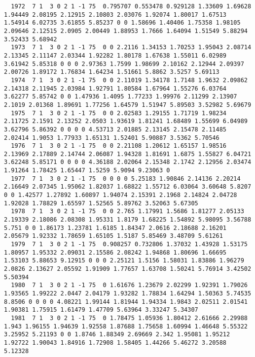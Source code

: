 \begin{landscape}
{\begin{verbatim}
  1972  7 1  3 0 2 1 -1 75  0.795707 0.553478 0.929128 1.33609 1.69628 1.94449 2.08195 2.12915 2.10803 2.03076 1.92074 1.80017 1.67513 1.54914 6.02735 3.61855 5.85237 0 0 1.58696 1.40406 1.75358 1.98105 2.09646 2.12515 2.0905 2.00449 1.88953 1.7666 1.64094 1.51549 5.88294  3.52433 5.68942
  1973  7 1  3 0 2 1 -1 75  0 0 2.2116 1.34153 1.70253 1.95043 2.08714 2.13345 2.11147 2.03344 1.92282 1.80178 1.67638 1.55011 6.02989 3.61942 5.85318 0 0 0 2.97363 1.7599 1.98699 2.10162 2.12944 2.09397 2.00726 1.89172 1.76834 1.64234 1.51661 5.8862 3.5257 5.69113
  1974  7 1  3 0 2 1 -1 75  0 0 2.11019 1.34178 1.7148 1.9632 2.09862 2.14318 2.11945 2.03984 1.92791 1.80584 1.67964 1.55276 6.03764 3.62277 5.85742 0 0 1.47936 1.4095 1.77233 1.99976 2.11299 2.13907 2.1019 2.01368 1.89691 1.77256 1.64579 1.51947 5.89503 3.52982 5.69679
  1975  7 1  3 0 2 1 -1 75  0 0 2.02583 1.29155 1.71719 1.98234 2.11725 2.1591 2.13252 2.0503 1.93619 1.81241 1.68489 1.55699 6.04989 3.62796 5.86392 0 0 0 0 4.53713 2.01885 2.13145 2.15478 2.11485 2.02414 1.9053 1.77933 1.65131 1.52401 5.90887 3.5362 5.70546
  1976  7 1  3 0 2 1 -1 75  0 0 2.21108 1.20612 1.65157 1.98516 2.13969 2.17889 2.14744 2.06087 1.94328 1.81691 1.6875 1.55827 6.04721 3.62248 5.85171 0 0 0 0 4.36188 2.02064 2.15348 2.1742 2.12956 2.03474 1.91264 1.78425 1.65447 1.5259 5.9094 9.23063 0
  1977  7 1  3 0 2 1 -1 75  0 0 0 0 5.25183 1.90846 2.14136 2.20214 2.16649 2.07345 1.95062 1.82037 1.68822 1.55712 6.03064 3.60648 5.8207 0 0 1.42577 1.27892 1.60897 1.94074 2.15391 2.1968 2.14824 2.04728 1.92028 1.78829 1.65597 1.52565 5.89762 3.52063 5.67305
  1978  7 1  3 0 2 1 -1 75  0 0 2.765 1.17991 1.5686 1.81277 2.05133 2.19339 2.18086 2.08308 1.95331 1.8179 1.68225 1.54892 5.98095 3.56788 5.751 0 0 1.86173 1.23781 1.6185 1.84347 2.0616 2.18688 2.16201 2.05679 1.92332 1.78659 1.65105 1.5187 5.85469 3.48709 5.61261
  1979  7 1  3 0 2 1 -1 75  0.908257 0.732806 1.37032 1.43928 1.53175 1.80957 1.95332 2.09031 2.15586 2.08242 1.94868 1.80696 1.66695 1.53103 5.88653 9.12915 0 0 0 2.25121 1.5156 1.58031 1.83886 1.96279 2.0826 2.13627 2.05592 1.91909 1.77657 1.63708 1.50241 5.76914 3.42502   5.50394
  1980  7 1  3 0 2 1 -1 75  0 1.61676 1.23679 2.02299 1.92391 1.79026 1.93565 1.99222 2.0447 2.04179 1.93282 1.78834 1.64294 1.50363 5.74535 8.8506 0 0 0 0 4.08221 1.99144 1.81944 1.94334 1.9843 2.02511 2.01541 1.90381 1.75915 1.61479 1.47709 5.63964 3.33247 5.34307
  1981  7 1  3 0 2 1 -1 75  0 1.78475 1.05936 1.80412 2.61666 2.29988 1.943 1.96155 1.94639 1.92558 1.87688 1.75658 1.60994 1.46648 5.55322 3.25952 5.21193 0 0 1.8746 1.88349 2.69669 2.342 1.95081 1.95212 1.92722 1.90043 1.84916 1.72908 1.58405 1.44266 5.46272 3.20588  5.12328

\end{verbatim}}
\end{landscape}
